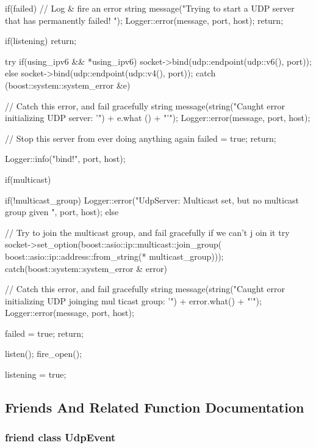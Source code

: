 \begin{DoxyCode}
{
    if(failed)
    {
        // Log & fire an error
        string message("Trying to start a UDP server that has permanently failed!
      ");
        Logger::error(message, port, host);
        return;
    }

    if(listening) return;

    try
    {
        if(using_ipv6 && *using_ipv6)
            socket->bind(udp::endpoint(udp::v6(), port));
        else
            socket->bind(udp::endpoint(udp::v4(), port));
    }
    catch (boost::system::system_error &e)
    {
        // Catch this error, and fail gracefully
        string message(string("Caught error initializing UDP server: '") + e.what
      () + "'");
        Logger::error(message, port, host);

        // Stop this server from ever doing anything again
        failed = true;
        return;
    }

    Logger::info("bind!", port, host);

    if(multicast)
    {
        if(!multicast_group)
        {
            Logger::error("UdpServer: Multicast set, but no multicast group given
      ", port, host);
        }
        else
        {
            // Try to join the multicast group, and fail gracefully if we can't j
      oin it
            try
            {
                socket->set_option(boost::asio::ip::multicast::join_group(
                            boost::asio::ip::address::from_string(*
      multicast_group)));
            }
            catch(boost::system::system_error & error)
            {
                // Catch this error, and fail gracefully
                string message(string("Caught error initializing UDP joinging mul
      ticast group: '") + error.what() + "'");
                Logger::error(message, port, host);

                failed = true;
                return;
            }
        }
    }

    listen();
    fire_open();

    listening = true;
}
\end{DoxyCode}


\subsection{Friends And Related Function Documentation}
\hypertarget{classUdpServer_aa3db591e179836aff8d4a6d952d43101}{
\subsubsection[{UdpEvent}]{\setlength{\rightskip}{0pt plus 5cm}friend class {\bf UdpEvent}}}
\label{classUdpServer_aa3db591e179836aff8d4a6d952d43101}


